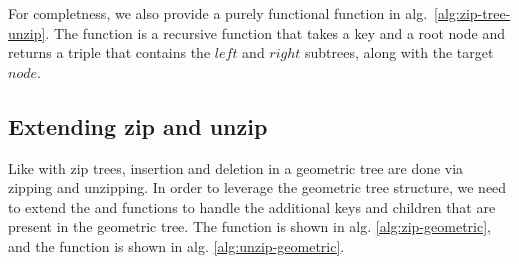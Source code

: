 \documentclass{article}
\begin{document}
For completness, we also provide a purely functional \unzip function in alg.~\ref{alg:zip-tree-unzip}. The \unzip function is a recursive function that takes a key and a root node and returns a triple that contains the $left$ and $right$ subtrees, along with the target $node$.

\begin{algorithm}[!htb]
    \caption{Purely functional unzip}\label{alg:zip-tree-unzip}
    \DontPrintSemicolon

\end{algorithm}

\subsection{Extending zip and unzip}

Like with zip trees, insertion and deletion in a geometric tree are done via zipping and unzipping. In order to leverage the geometric tree structure, we need to extend the \zip and \unzip functions to handle the additional keys and children that are present in the geometric tree. The \zip function is shown in alg. \ref{alg:zip-geometric}, and the \unzip function is shown in alg. \ref{alg:unzip-geometric}.
\end{document}
